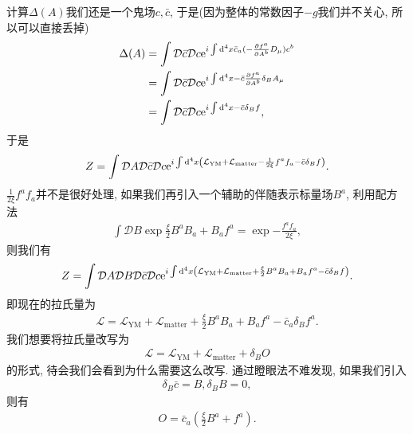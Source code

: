 计算$\Delta(A)$我们还是一个鬼场$c, \bar c$, 于是(因为整体的常数因子$-g$我们并不关心, 所以可以直接丢掉)
\begin{align}
    \Delta(A)&=\int\mathcal D\bar c\mathcal Dc\mathrm e^{i\int\mathrm d^4x\bar c_a(-\frac{\partial f^a}{\partial A^b}D_\mu) c^b}\\
    &=\int\mathcal D\bar c\mathcal Dc\mathrm e^{i\int\mathrm d^4x-\bar c\frac{\partial f^a}{\partial A^b}\delta_B A_\mu}\\
    &=\int\mathcal D\bar c\mathcal Dc\mathrm e^{i\int\mathrm d^4x-\bar c\delta_B f},
\end{align}
于是
\begin{align}
    Z=\int\mathcal DA\mathcal D\bar c\mathcal Dc\mathrm e^{i\int\mathrm d^4x\left(\mathcal L_{\mathrm{YM}}+\mathcal L_{\mathrm{matter}}-\frac1{2\xi}f^af_a-\bar c\delta_B f\right)}.
\end{align}
$\frac1{2\xi}f^af_a$并不是很好处理, 如果我们再引入一个辅助的伴随表示标量场$B^a$, 利用配方法
\begin{align}
    \int\mathcal D B\exp{\frac\xi2 B^aB_a+B_af^a}=\exp{-\frac{f^af_a}{2\xi}},
\end{align}
则我们有
\begin{align}
    Z=\int\mathcal DA\mathcal DB\mathcal D\bar c\mathcal Dc\mathrm e^{i\int\mathrm d^4x\left(\mathcal L_{\mathrm{YM}}+\mathcal L_{\mathrm{matter}}+\frac\xi2 B^aB_a+B_af^a-\bar c\delta_B f\right)}.
\end{align}
即现在的拉氏量为
\begin{align}
    \mathcal L=\mathcal L_{\mathrm{YM}}+\mathcal L_{\mathrm{matter}}+\frac\xi2 B^aB_a+B_af^a-\bar c_a\delta_B f^a.
\end{align}
我们想要将拉氏量改写为
\begin{align}
    \mathcal L=\mathcal L_{\mathrm{YM}}+\mathcal L_{\mathrm{matter}}+\delta_B O
\end{align}
的形式, 待会我们会看到为什么需要这么改写. 通过瞪眼法不难发现, 如果我们引入
\begin{align}
    \delta_B\bar c=B, \delta_B B=0, 
\end{align}
则有
\begin{align}
    O=\bar c_a\left(\frac\xi2B^a+f^a\right).
\end{align}

